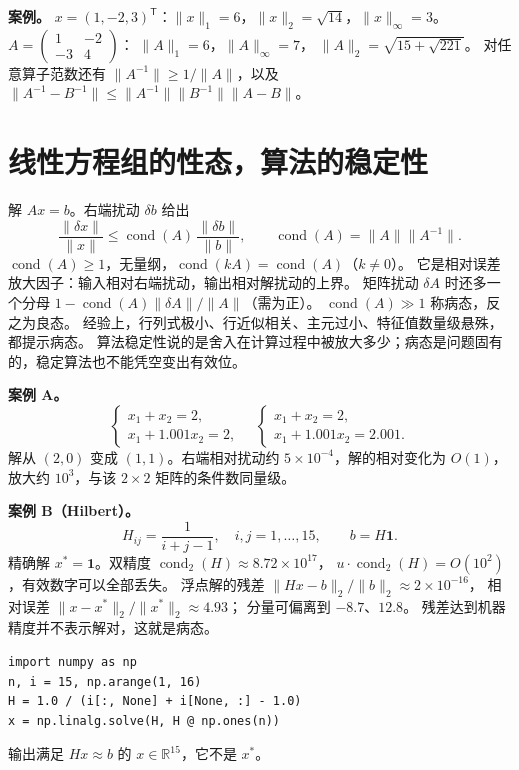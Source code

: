 \textbf{案例。}
$x=(1,-2,3)^{\mathsf T}$：$\lVert x\rVert_1=6$，$\lVert x\rVert_2=\sqrt{14}$，$\lVert x\rVert_\infty=3$。
$A=\begin{pmatrix}1&-2\\-3&4\end{pmatrix}$：
$\lVert A\rVert_1=6$，$\lVert A\rVert_\infty=7$，
$\lVert A\rVert_2=\sqrt{15+\sqrt{221}}$。
对任意算子范数还有 $\lVert A^{-1}\rVert\ge 1/\lVert A\rVert$，以及
$\lVert A^{-1}-B^{-1}\rVert\le\lVert A^{-1}\rVert\lVert B^{-1}\rVert\lVert A-B\rVert$。

\section{线性方程组的性态，算法的稳定性}

解 $Ax=b$。右端扰动 $\delta b$ 给出
\begin{equation}
\frac{\lVert\delta x\rVert}{\lVert x\rVert}
\le
\operatorname{cond}(A)\,\frac{\lVert\delta b\rVert}{\lVert b\rVert},
\qquad
\operatorname{cond}(A)=\lVert A\rVert\lVert A^{-1}\rVert.
\end{equation}
$\operatorname{cond}(A)\ge 1$，无量纲，$\operatorname{cond}(kA)=\operatorname{cond}(A)$（$k\neq 0$）。
它是相对误差放大因子：输入相对右端扰动，输出相对解扰动的上界。
矩阵扰动 $\delta A$ 时还多一个分母 $1-\operatorname{cond}(A)\lVert\delta A\rVert/\lVert A\rVert$（需为正）。
$\operatorname{cond}(A)\gg 1$ 称病态，反之为良态。
经验上，行列式极小、行近似相关、主元过小、特征值数量级悬殊，都提示病态。
算法稳定性说的是舍入在计算过程中被放大多少；病态是问题固有的，稳定算法也不能凭空变出有效位。

\textbf{案例 A。}
\[
\begin{cases}x_1+x_2=2,\\ x_1+1.001 x_2=2,\end{cases}
\quad
\begin{cases}x_1+x_2=2,\\ x_1+1.001 x_2=2.001.\end{cases}
\]
解从 $(2,0)$ 变成 $(1,1)$。右端相对扰动约 $5\times 10^{-4}$，解的相对变化为 $O(1)$，放大约 $10^3$，与该 $2\times 2$ 矩阵的条件数同量级。

\textbf{案例 B（Hilbert）。}
\[
H_{ij}=\frac{1}{i+j-1},\quad i,j=1,\ldots,15,
\qquad
b=H\mathbf{1}.
\]
精确解 $x^*=\mathbf{1}$。双精度 $\operatorname{cond}_2(H)\approx 8.72\times 10^{17}$，
$u\cdot\operatorname{cond}_2(H)=O(10^2)$，有效数字可以全部丢失。
浮点解的残差 $\lVert Hx-b\rVert_2/\lVert b\rVert_2\approx 2\times 10^{-16}$，
相对误差 $\lVert x-x^*\rVert_2/\lVert x^*\rVert_2\approx 4.93$；
分量可偏离到 $-8.7$、$12.8$。
残差达到机器精度并不表示解对，这就是病态。
\begin{lstlisting}
import numpy as np
n, i = 15, np.arange(1, 16)
H = 1.0 / (i[:, None] + i[None, :] - 1.0)
x = np.linalg.solve(H, H @ np.ones(n))
\end{lstlisting}
 输出满足 $Hx\approx b$ 的 $x\in\mathbb{R}^{15}$，它不是 $x^*$。
